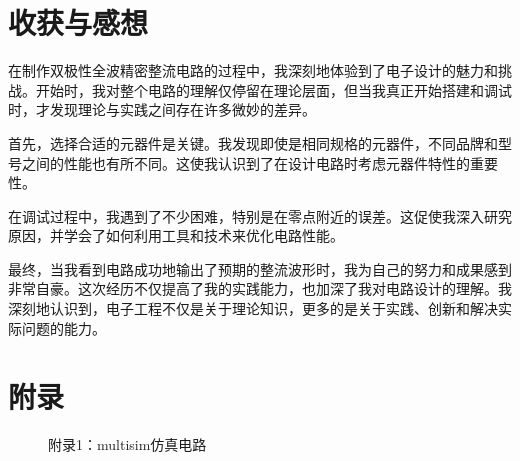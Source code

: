 \documentclass[UTF8,titlepage,a4paper]{ctexart}
\numberwithin{figure}{section}
\begin{document}
\section{收获与感想}
在制作双极性全波精密整流电路的过程中，我深刻地体验到了电子设计的魅力和挑战。开始时，我对整个电路的理解仅停留在理论层面，但当我真正开始搭建和调试时，才发现理论与实践之间存在许多微妙的差异。

首先，选择合适的元器件是关键。我发现即使是相同规格的元器件，不同品牌和型号之间的性能也有所不同。这使我认识到了在设计电路时考虑元器件特性的重要性。

在调试过程中，我遇到了不少困难，特别是在零点附近的误差。这促使我深入研究原因，并学会了如何利用工具和技术来优化电路性能。

最终，当我看到电路成功地输出了预期的整流波形时，我为自己的努力和成果感到非常自豪。这次经历不仅提高了我的实践能力，也加深了我对电路设计的理解。我深刻地认识到，电子工程不仅是关于理论知识，更多的是关于实践、创新和解决实际问题的能力。

\clearpage
\nocite{*}



\section*{附录}
\begin{figure}[H]
\centering
 \caption{附录1：multisim仿真电路}
 \label{}
\end{figure}
\end{document}
